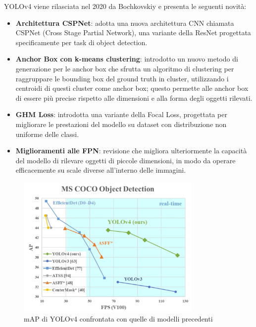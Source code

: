 YOLOv4 viene rilasciata nel 2020 da Bochkovskiy\cite{21} e presenta le seguenti novità:
\begin{itemize}
  \item \textbf{Architettura CSPNet}: adotta una nuova architettura CNN chiamata CSPNet (Cross Stage Partial Network), una variante della ResNet progettata specificamente per task di object detection.
  \item \textbf{Anchor Box con k-means clustering}: introdotto un nuovo metodo di generazione per le anchor box che sfrutta un algoritmo di clustering per raggruppare le bounding box del ground truth in cluster, utilizzando i centroidi di questi cluster come anchor box; questo permette alle anchor box di essere più precise rispetto alle dimensioni e alla forma degli oggetti rilevati.
  \item \textbf{GHM Loss}: introdotta una variante della Focal Loss, progettata per migliorare le prestazioni del modello su dataset con distribuzione non uniforme delle classi.
  \item \textbf{Miglioramenti alle FPN}: revisione che migliora ulteriormente la capacità del modello di rilevare oggetti di piccole dimensioni, in modo da operare efficacemente su scale diverse all'interno delle immagini.
\end{itemize}

\begin{figure}[ht]
    \centering
    \includegraphics[width=0.8\textwidth]{files/capitoli/2-yolo/assets/yolov4-benchmark.jpeg}
    \caption{\label{fig:yolov4-benchmark}mAP di YOLOv4 confrontata con quelle di modelli precedenti\cite{19}}
\end{figure}

\newpage

